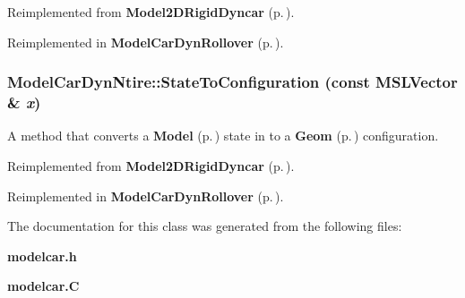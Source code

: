 Reimplemented from {\bf Model2DRigid\-Dyncar} {\rm (p.\,\pageref{classModel2DRigidDyncar_a5})}.

Reimplemented in {\bf Model\-Car\-Dyn\-Rollover} {\rm (p.\,\pageref{classModelCarDynRollover_a6})}.
\subsubsection{ Model\-Car\-Dyn\-Ntire::State\-To\-Configuration (const {\bf MSLVector} \& {\em x})\hspace{0.3cm}{\tt  [virtual]}}\label{classModelCarDynNtire_a2}


A method that converts a {\bf Model} {\rm (p.\,\pageref{classModel})} state in to a {\bf Geom} {\rm (p.\,\pageref{classGeom})} configuration.



Reimplemented from {\bf Model2DRigid\-Dyncar} {\rm (p.\,\pageref{classModel2DRigidDyncar_a3})}.

Reimplemented in {\bf Model\-Car\-Dyn\-Rollover} {\rm (p.\,\pageref{classModelCarDynRollover_a4})}.

The documentation for this class was generated from the following files:\begin{CompactItemize}
\item 
{\bf modelcar.h}\item 
{\bf modelcar.C}\end{CompactItemize}
